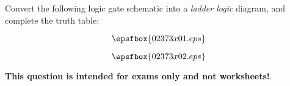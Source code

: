 

Convert the following logic gate schematic into a {\it ladder logic} diagram, and complete the truth table:

$$\epsfbox{02373x01.eps}$$







$$\epsfbox{02373x02.eps}$$







{\bf This question is intended for exams only and not worksheets!}.




